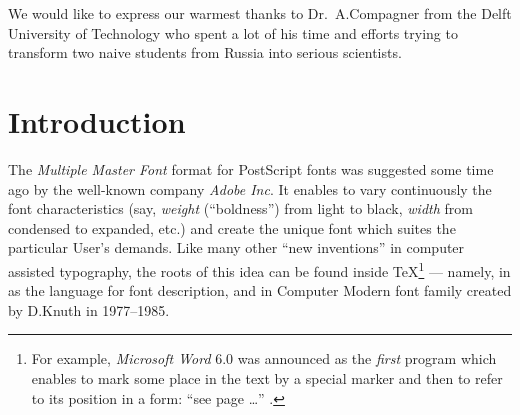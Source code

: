 \maketitle

\begin{flushright}
\begin{minipage}{0.55\textwidth}
\small
We would like to express our warmest thanks
to Dr.\ A.Compagner from the Delft University of Technology
who spent a lot of his time and efforts
trying to transform two naive students from Russia
into serious scientists.
\end{minipage}
\end{flushright}

\bigskip

\begin{abstract}
The style file {\sc mff.sty} simulates the effect of
{\sl Multiple Master Fonts} created by Adobe using
the Computer Modern typefaces as a template.
It enables to vary continuously in a wide range
the shape of \TeX{} fonts and create the unique font
which suites the User's demands.
Although originally {\sc mff.sty} was created for internal
purposes to investigate the possibilities  hidden inside
the \MF{} source code for Computer Modern typefaces,
it might be useful for professional applications too.
The style file works correctly with
\LaTeX{} 2$_{\hbox{\normalsize$\varepsilon$}}$
as well as with \LaTeX{} $2.09$.
\end{abstract}

\section{Introduction}

The {\sl Multiple Master Font} format for PostScript
fonts was suggested some time ago
by the well-known company {\sl Adobe Inc}.
It enables to vary continuously the
font characteristics (say, {\em weight} (``boldness'')
from light to black, {\em width} from condensed to expanded,
etc.) and create the unique font which suites
the particular User's demands.
Like many other ``new inventions''
in computer assisted typography, the roots of this
idea can be found inside \TeX{}\footnote{For example,
{\sl Microsoft Word} 6.0 was announced as the {\em first}
program which enables to mark some place in the text by
a special marker and then to refer to its position
in a form: ``see page \dots'' \hackersmile.} --- namely, in \MF{}
as the language for font description, and in Computer
Modern font family created by D.Knuth in 1977--1985.

